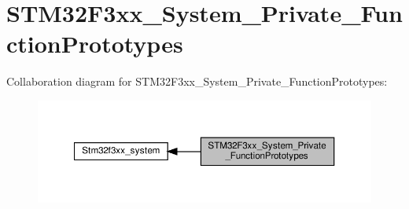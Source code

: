 \hypertarget{group__STM32F3xx__System__Private__FunctionPrototypes}{}\section{S\+T\+M32\+F3xx\+\_\+\+System\+\_\+\+Private\+\_\+\+Function\+Prototypes}
\label{group__STM32F3xx__System__Private__FunctionPrototypes}
Collaboration diagram for S\+T\+M32\+F3xx\+\_\+\+System\+\_\+\+Private\+\_\+\+Function\+Prototypes\+:\nopagebreak
\begin{figure}[H]
\begin{center}
\leavevmode
\includegraphics[width=350pt]{group__STM32F3xx__System__Private__FunctionPrototypes}
\end{center}
\end{figure}
